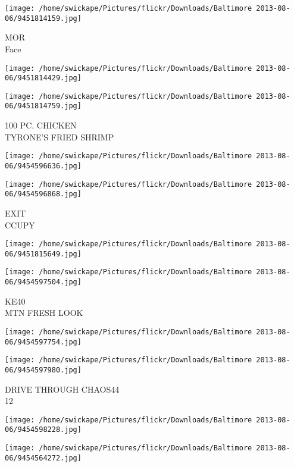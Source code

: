 \documentclass[10pt,letterpaper]{article}
\begin{document}
\vspace{0.25in}
\texttt{[image: /home/swickape/Pictures/flickr/Downloads/Baltimore 2013-08-06/9451814159.jpg]}

MOR\\
Face
\pagebreak

\texttt{[image: /home/swickape/Pictures/flickr/Downloads/Baltimore 2013-08-06/9451814429.jpg]}

\vspace{0.25in}
\texttt{[image: /home/swickape/Pictures/flickr/Downloads/Baltimore 2013-08-06/9451814759.jpg]}

100 PC. CHICKEN\\
TYRONE'S FRIED SHRIMP
\pagebreak

\texttt{[image: /home/swickape/Pictures/flickr/Downloads/Baltimore 2013-08-06/9454596636.jpg]}

\vspace{0.25in}
\texttt{[image: /home/swickape/Pictures/flickr/Downloads/Baltimore 2013-08-06/9454596868.jpg]}

EXIT\\
CCUPY
\pagebreak

\texttt{[image: /home/swickape/Pictures/flickr/Downloads/Baltimore 2013-08-06/9451815649.jpg]}

\vspace{0.25in}
\texttt{[image: /home/swickape/Pictures/flickr/Downloads/Baltimore 2013-08-06/9454597504.jpg]}

KE40\\
MTN FRESH LOOK
\pagebreak

\texttt{[image: /home/swickape/Pictures/flickr/Downloads/Baltimore 2013-08-06/9454597754.jpg]}

\vspace{0.25in}
\texttt{[image: /home/swickape/Pictures/flickr/Downloads/Baltimore 2013-08-06/9454597980.jpg]}

DRIVE THROUGH CHAOS44\\
12
\pagebreak

\texttt{[image: /home/swickape/Pictures/flickr/Downloads/Baltimore 2013-08-06/9454598228.jpg]}

\vspace{0.25in}
\texttt{[image: /home/swickape/Pictures/flickr/Downloads/Baltimore 2013-08-06/9454564272.jpg]}
\end{document}
